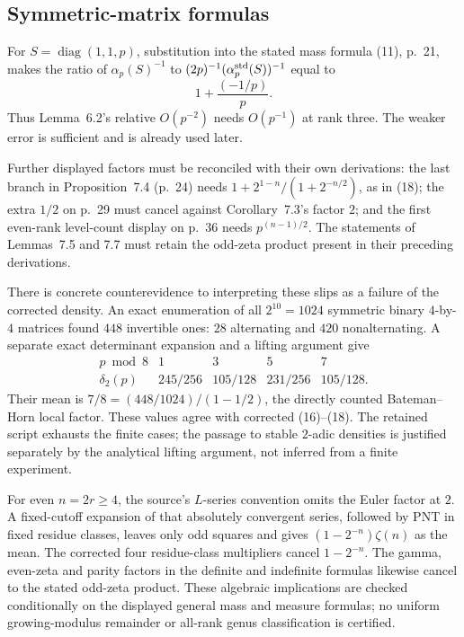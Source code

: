 \documentclass[10pt]{article}
\begin{document}
\subsection*{Symmetric-matrix formulas}
For \(S=\operatorname{diag}(1,1,p)\), substitution into the stated mass formula (11), p. 21, makes the ratio of \(\alpha_p(S)^{-1}\) to \((2p)^{-1}(\alpha_p^{\rm std}(S))^{-1}\) equal to \[1+\frac{(-1/p)}p .\] Thus Lemma 6.2’s relative \(O(p^{-2})\) needs \(O(p^{-1})\) at rank three. The weaker error is sufficient and is already used later.\par
Further displayed factors must be reconciled with their own derivations: the last branch in Proposition 7.4 (p. 24) needs \(1+2^{1-n}/(1+2^{-n/2})\), as in (18); the extra \(1/2\) on p. 29 must cancel against Corollary 7.3’s factor \(2\); and the first even-rank level-count display on p. 36 needs \(p^{(n-1)/2}\). The statements of Lemmas 7.5 and 7.7 must retain the odd-zeta product present in their preceding derivations.\par
There is concrete counterevidence to interpreting these slips as a failure of the corrected density. An exact enumeration of all \(2^{10}=1024\) symmetric binary \(4\)-by-\(4\) matrices found \(448\) invertible ones: \(28\) alternating and \(420\) nonalternating. A separate exact determinant expansion and a lifting argument give \[\begin{array}{c|cccc}
 p\bmod8&1&3&5&7\\ \hline
 \delta_2(p)&245/256&105/128&231/256&105/128 .
\end{array}\] Their mean is \(7/8=(448/1024)/(1-1/2)\), the directly counted Bateman–Horn local factor. These values agree with corrected (16)–(18). The retained script exhausts the finite cases; the passage to stable \(2\)-adic densities is justified separately by the analytical lifting argument, not inferred from a finite experiment.\par
For even \(n=2r\ge4\), the source’s \(L\)-series convention omits the Euler factor at \(2\). A fixed-cutoff expansion of that absolutely convergent series, followed by PNT in fixed residue classes, leaves only odd squares and gives \((1-2^{-n})\zeta(n)\) as the mean. The corrected four residue-class multipliers cancel \(1-2^{-n}\). The gamma, even-zeta and parity factors in the definite and indefinite formulas likewise cancel to the stated odd-zeta product. These algebraic implications are checked conditionally on the displayed general mass and measure formulas; no uniform growing-modulus remainder or all-rank genus classification is certified.\par
\end{document}
